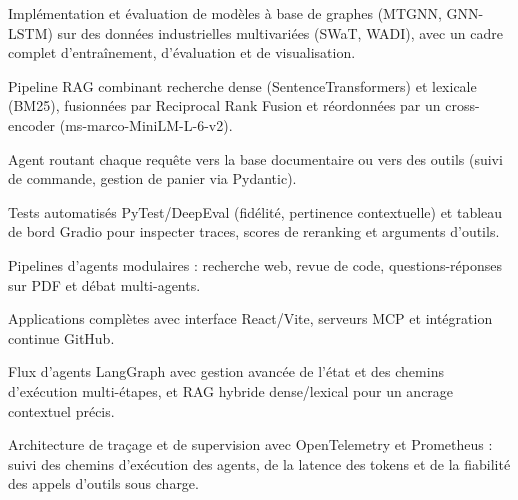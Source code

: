 \begin{cvitems}
  \item Implémentation et évaluation de modèles à base de graphes (MTGNN, GNN-LSTM) sur des données industrielles multivariées (SWaT, WADI), avec un cadre complet d’entraînement, d’évaluation et de visualisation.
\end{cvitems}

\begin{cvitems}
  \item Pipeline RAG combinant recherche dense (SentenceTransformers) et lexicale (BM25), fusionnées par Reciprocal Rank Fusion et réordonnées par un cross-encoder (ms-marco-MiniLM-L-6-v2).
  \item Agent routant chaque requête vers la base documentaire ou vers des outils (suivi de commande, gestion de panier via Pydantic).
  \item Tests automatisés PyTest/DeepEval (fidélité, pertinence contextuelle) et tableau de bord Gradio pour inspecter traces, scores de reranking et arguments d’outils.
\end{cvitems}

\begin{cvitems}
  \item Pipelines d’agents modulaires : recherche web, revue de code, questions-réponses sur PDF et débat multi-agents.
  \item Applications complètes avec interface React/Vite, serveurs MCP et intégration continue GitHub.
\end{cvitems}

\begin{cvitems}
  \item Flux d’agents LangGraph avec gestion avancée de l’état et des chemins d’exécution multi-étapes, et RAG hybride dense/lexical pour un ancrage contextuel précis.
\end{cvitems}

\begin{cvitems}
  \item Architecture de traçage et de supervision avec OpenTelemetry et Prometheus : suivi des chemins d’exécution des agents, de la latence des tokens et de la fiabilité des appels d’outils sous charge.
\end{cvitems}


